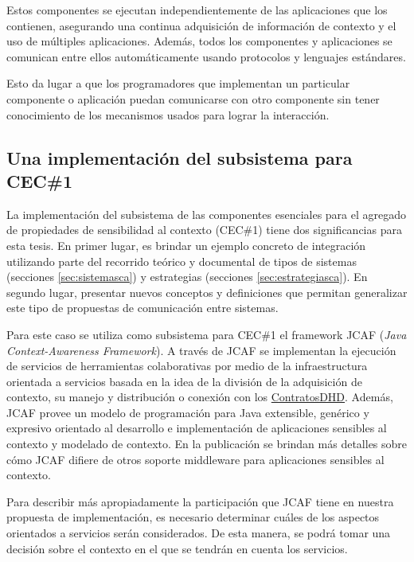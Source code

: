 \begin{itemize}
Estos componentes se ejecutan independientemente de las aplicaciones que los contienen, asegurando una continua adquisición de información de contexto y el uso de múltiples aplicaciones. Además, todos los componentes y aplicaciones se comunican entre ellos automáticamente usando protocolos y lenguajes estándares.

Esto da lugar a que los programadores que implementan un particular componente o aplicación puedan comunicarse con otro componente sin tener conocimiento de los mecanismos usados para lograr la interacción.

\parskip=1cm 

\subsection{Una implementación del subsistema para CEC\#1}

La implementación del subsistema de las componentes esenciales para el agregado de propiedades de sensibilidad al contexto (CEC\#1) tiene dos significancias para esta tesis. En primer lugar, es brindar un ejemplo concreto de integración utilizando parte del recorrido teórico y documental de tipos de sistemas (secciones \ref{sec:sistemasca}) y estrategias (secciones \ref{sec:estrategiasca}). En segundo lugar, presentar nuevos conceptos y definiciones que permitan generalizar este tipo de propuestas de comunicación entre sistemas. 

Para este caso se utiliza como subsistema para CEC\#1 el framework JCAF  (\textit{Java Context-Awareness Framework}). A través de JCAF se implementan la ejecución de servicios de herramientas colaborativas por medio de la infraestructura orientada a servicios basada en la idea de la división de la adquisición de contexto, su manejo y distribución o conexión con los \hyperref[contratosDHD]{ContratosDHD}. Además, JCAF provee un modelo de programación para Java extensible, genérico y expresivo orientado al desarrollo e implementación de aplicaciones sensibles al contexto y modelado de contexto. En la publicación \cite{JCAF} se brindan más detalles sobre cómo JCAF difiere de otros soporte middleware para aplicaciones sensibles al contexto. 

Para describir más apropiadamente la participación que JCAF tiene en nuestra propuesta de implementación, es necesario determinar cuáles de los aspectos orientados a servicios serán considerados. De esta manera, se podrá tomar una decisión sobre el contexto en el que se tendrán en cuenta los servicios.



\end{itemize}
